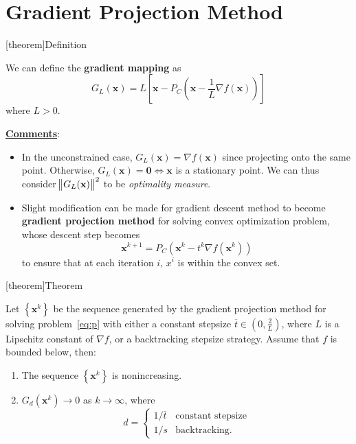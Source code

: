 \documentclass[12pt]{report}
\theoremstyle{definition}
\begin{document}
\section{Gradient Projection Method}

[theorem]{Definition}
\begin{gradient mapping}
    We can define the \textbf{gradient mapping} as
    \[
        G_L(\mathbf{x})=L\left[\mathbf{x}-P_C\left(\mathbf{x}-\frac{1}{L}\nabla
        f(\mathbf{x})\right)\right]
    \]
    where $L>0$. 
\end{gradient mapping}
\underline{\textbf{Comments}}: 
\begin{itemize}
    \item In the unconstrained case,
        $G_L(\mathbf{x})=\nabla f(\mathbf{x})$ since projecting onto the same point.
        Otherwise, $G_L(\mathbf{x})=\mathbf{0}\iff\mathbf{x}$ is a stationary point.
        We can thus consider $\norm{G_L(\mathbf{x})}^2$ to be 
        \emph{optimality measure}.
    \item Slight modification can be made for gradient descent method to become
        \textbf{gradient projection method} for solving convex optimization
        problem, whose descent step becomes
        \[
            \mathbf{x}^{k+1}=P_C\left(\mathbf{x}^k-t^k\nabla
            f(\mathbf{x}^k)\right)
        \]
        to ensure that at each iteration $i$, $x^{i}$ is within the convex set.
\end{itemize}

[theorem]{Theorem}
\begin{convergence of gradient projection method}
    Let $\left\{\mathbf{x}^k\right\}$ be the sequence generated by the gradient
    projection method for solving problem~\eqref{eq:p} with either a constant
    stepsize $\overline{t}\in\left(0,\frac{2}{L}\right)$, where $L$ is a
    Lipschitz constant of $\nabla f$, or a backtracking stepsize strategy.
    Assume that $f$ is bounded below, then:
    \begin{enumerate}
        \item The sequence $\left\{\mathbf{x}^k\right\}$ is nonincreasing.
        \item $G_d(\mathbf{x}^k)\rightarrow 0$ as $k\rightarrow \infty$, where
            \[
                d=
                \begin{cases}
                    1 / \overline{t} & \text{constant stepsize} \\
                    1 / s & \text{backtracking}.
                \end{cases}
            \]
    \end{enumerate}
    
\end{convergence of gradient projection method}
\end{document}
